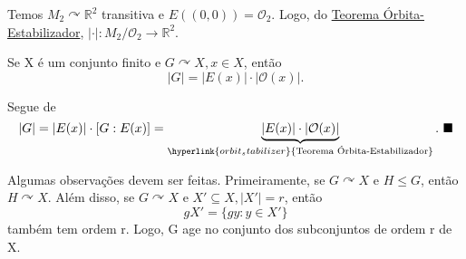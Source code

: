 \documentclass[Algebra/algebra_notes.tex]{subfiles}
\begin{document}
\begin{example*}
	Temos \(M_{2} \curvearrowright \mathbb{R}^{2}\) transitiva e \(E((0, 0)) = \mathcal{O}_{2}\). Logo, do \hyperlink{orbit_stabilizer}{Teorema Órbita-Estabilizador},
	\(|\cdot |:M_{2}/\mathcal{O}_{2}\rightarrow \mathbb{R}^{2}\).
\end{example*}
\begin{crl*}
	Se X é um conjunto finito e \(G \curvearrowright X, x\in X\), então
	\[
		|G| = |E(x)|\cdot |\mathcal{O}(x)|.
	\]
\end{crl*}
\begin{proof*}
	Segue de
	\[
		|G| = |E(x)|\cdot [G:E(x)] = \underbrace{|E(x)|\cdot |\mathcal{O}(x)|}_{\hyperlink{orbit_stabilizer}{\text{Teorema Órbita-Estabilizador}}}.\text{ \qedsymbol}
	\]
\end{proof*}
Algumas observações devem ser feitas. Primeiramente, se \(G \curvearrowright X\) e \(H\leq G\), então \(H \curvearrowright X\).
Além disso, se \(G \curvearrowright X\) e \(X'\subseteq{X}, |X'| = r\), então
\[
	gX' = \{gy: y\in X'\}
\]
também tem ordem r. Logo, G age no conjunto dos subconjuntos de ordem r de X.
\end{document}
